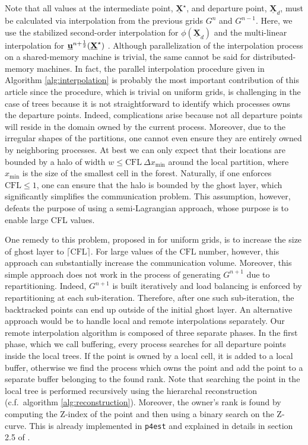 Note that all values at the intermediate point, $\underline{\mathbf{X}}^\star$, and departure point, $\underline{\mathbf{X}}_d$, must be calculated via interpolation from the previous grids $G^{n}$ and $G^{n-1}$. Here, we use the stabilized second-order interpolation for $\phi(\underline{\mathbf{X}}_d)$ and the multi-linear interpolation for $\underline{\mathbf{u}}^{n+\frac{1}{2}}(\underline{\mathbf{X}}^\star)$ \cite{Min;Gibou:07:A-second-order-accur}. Although parallelization of the interpolation process on a shared-memory machine is trivial, the same cannot be said for distributed-memory machines. In fact, the parallel interpolation procedure given in Algorithm \ref{alg:interpolation} is probably the most important contribution of this article since the procedure, which is trivial on uniform grids, is challenging in the case of trees because it is not straightforward to identify which processes owns the departure points. Indeed, complications arise because not all departure points will reside in the domain owned by the current process. Moreover, due to the irregular shapes of the partitions, one cannot even ensure they are entirely owned by neighboring processes. At best we can only expect that their locations are bounded by a halo of width $w \le \text{CFL} \: \Delta x_{\min}$ around the local partition, where $x_{\min}$ is the size of the smallest cell in the forest. Naturally, if one enforces $\text{CFL} \le 1$, one can ensure that the halo is bounded by the ghost layer, which significantly simplifies the communication problem. This assumption, however, defeats the purpose of using a semi-Lagrangian approach, whose purpose is to enable large CFL values.

One remedy to this problem, proposed in \cite{Thomas;Cote:95:Massively-parallel-s} for uniform grids, is to increase the size of ghost layer to $\lceil \text{CFL} \rceil$. For large values of the $\text{CFL}$ number, however, this approach can substantially increase the communication volume. Moreover, this simple approach does not work in the process of generating $G^{n+1}$ due to repartitioning. Indeed, $G^{n+1}$ is built iteratively and load balancing is enforced by repartitioning at each sub-iteration. Therefore, after one such sub-iteration, the backtracked points can end up outside of the initial ghost layer. An alternative approach would be to handle local and remote interpolations separately. Our remote interpolation algorithm is composed of three separate phases. In the first phase, which we call buffering, every process searches for all departure points inside the local trees. If the point is owned by a local cell, it is added to a local buffer, otherwise we find the process which owns the point and add the point to a separate buffer belonging to the found rank. Note that searching the point in the local tree is performed recursively using the hierarchal reconstruction (c.f.\ algorithm \ref{alg:reconstruction}). Moreover, the owner's rank is found by computing the Z-index of the point and then using a binary search on the Z-curve. This is already implemented in \texttt{p4est} and explained in details in section 2.5 of \cite{Burstedde;Wilcox;Ghattas:11:p4est:-Scalable-Algo}.

